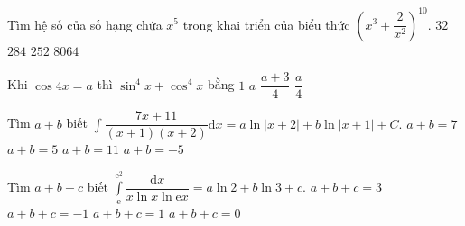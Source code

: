 \begin{ex}%
Tìm hệ số của số hạng chứa $x^5$ trong khai triển của biểu thức $\left (x^3+\dfrac{2}{x^2}\right )^{10}.$
\choice
{$32$}
{$284$}
{$252$}
{\True $8064$}
\end{ex}

\begin{ex}%
Khi $\cos 4x =a$ thì $\sin^4x +\cos^4x $ bằng
\choice
{$1$}
{$a$}
{\True $\dfrac{a+3}{4}$}
{$\dfrac{a}{4}$}
\end{ex}

\begin{ex}%
Tìm $a+b$ biết $\displaystyle \int \dfrac{7x+11}{(x+1)(x+2)} \mathrm{d}x=a\ln|x+2|+b\ln|x+1|+C.$
\choice
{\True $a+b=7$}
{$a+b=5$}
{$a+b=11$}
{$a+b=-5$}
\end{ex}

\begin{ex}%
Tìm $a+b+c$  biết $\displaystyle \int \limits_{\mathrm{e}}^{\mathrm{e}^2} \dfrac{\mathrm{d}x}{x\ln x\ln \mathrm{e}x} = a\ln 2+b\ln 3+c.$
\choice
{$a+b+c=3$ }
{$a+b+c=-1$ }
{\True $a+b+c=1$ }
{$a+b+c=0$ }
\end{ex}

